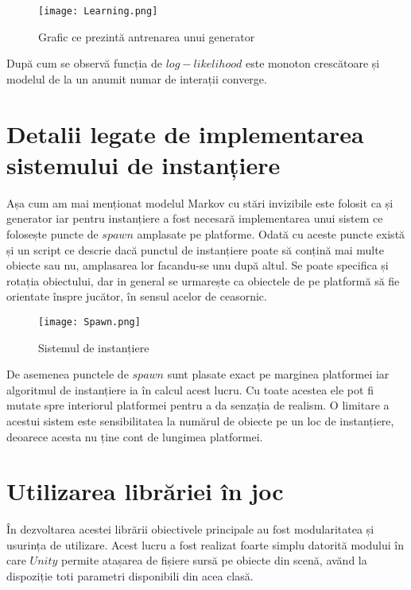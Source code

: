 \vspace{10mm}
\begin{figure}[H]
\centering
\texttt{[image: Learning.png]} \par
\caption{Grafic ce prezintă antrenarea unui generator}
\end{figure}

După cum se observă funcția de $log-likelihood$ este monoton crescătoare și modelul de la un anumit numar de interații converge.\par

\section{Detalii legate de implementarea sistemului de instanțiere}

Așa cum am mai menționat modelul Markov cu stări invizibile este folosit ca și generator iar pentru instanțiere a fost necesară implementarea unui sistem ce folosește puncte de $spawn$ amplasate pe platforme. Odată cu aceste puncte există și un script ce descrie dacă punctul de instanțiere poate să conțină mai multe obiecte sau nu, amplasarea lor facandu-se unu după altul. Se poate specifica și rotația obiectului, dar in general se urmarește ca obiectele de pe platformă să fie orientate înspre jucător, în sensul acelor de ceasornic.\par

\vspace{10mm}
\begin{figure}[H]
\centering
\texttt{[image: Spawn.png]} \par
\caption{Sistemul de instanțiere}
\end{figure}

De asemenea punctele de $spawn$ sunt plasate exact pe marginea platformei iar algoritmul de instanțiere ia în calcul acest lucru. Cu toate acestea ele pot fi mutate spre interiorul platformei pentru a da senzația de realism. O limitare a acestui sistem este sensibilitatea la numărul de obiecte pe un loc de instanțiere, deoarece acesta nu ține cont de lungimea platformei.\par

\section{Utilizarea librăriei în joc}

În dezvoltarea acestei librării obiectivele principale au fost modularitatea și usurința de utilizare. Acest lucru a fost realizat foarte simplu datorită modului în care $Unity$ permite atașarea de fișiere sursă pe obiecte din scenă, avănd la dispoziție toti parametri disponibili din acea clasă.\par

